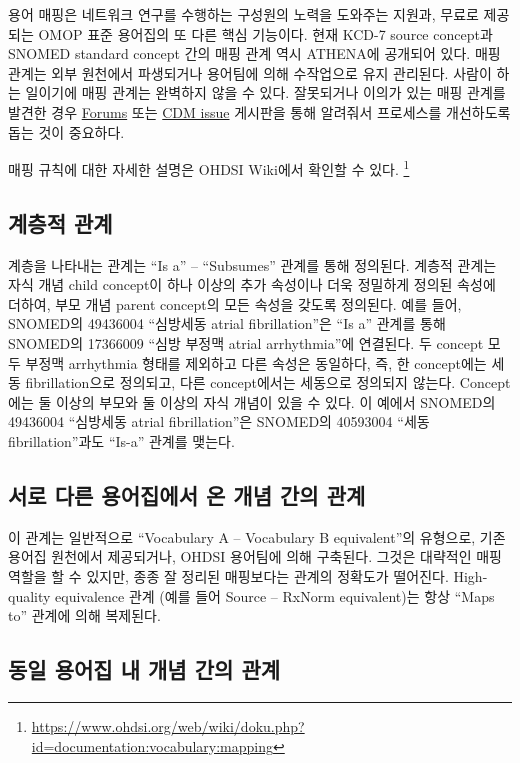 \documentclass[10.5pt]{book}
\let\rmarkdownfootnote\footnote%
\def\footnote{\protect\rmarkdownfootnote}
\theoremstyle{definition}
\theoremstyle{definition}
\theoremstyle{definition}
\theoremstyle{remark}
\begin{document}
용어 매핑은 네트워크 연구를 수행하는 구성원의 노력을 도와주는 지원과,
무료로 제공되는 OMOP 표준 용어집의 또 다른 핵심 기능이다. 현재 KCD-7
source concept과 SNOMED standard concept 간의 매핑 관계 역시 ATHENA에
공개되어 있다. 매핑 관계는 외부 원천에서 파생되거나 용어팀에 의해
수작업으로 유지 관리된다. 사람이 하는 일이기에 매핑 관계는 완벽하지 않을
수 있다. 잘못되거나 이의가 있는 매핑 관계를 발견한 경우
\href{https://forums.ohdsi.org}{Forums} 또는
\href{https://github.com/OHDSI/CommonDataModel/issues}{CDM issue}
게시판을 통해 알려줘서 프로세스를 개선하도록 돕는 것이 중요하다.

매핑 규칙에 대한 자세한 설명은 OHDSI Wiki에서 확인할 수 있다. \footnote{\url{https://www.ohdsi.org/web/wiki/doku.php?id=documentation:vocabulary:mapping}}

\subsection{계층적 관계}\label{-}

계층을 나타내는 관계는 ``Is a'' -- ``Subsumes'' 관계를 통해 정의된다.
계층적 관계는 자식 개념 child concept이 하나 이상의 추가 속성이나 더욱
정밀하게 정의된 속성에 더하여, 부모 개념 parent concept의 모든 속성을
갖도록 정의된다. 예를 들어, SNOMED의 49436004 ``심방세동 atrial
fibrillation''은 ``Is a'' 관계를 통해 SNOMED의 17366009 ``심방 부정맥
atrial arrhythmia''에 연결된다. 두 concept 모두 부정맥 arrhythmia 형태를
제외하고 다른 속성은 동일하다, 즉, 한 concept에는 세동 fibrillation으로
정의되고, 다른 concept에서는 세동으로 정의되지 않는다. Concept에는 둘
이상의 부모와 둘 이상의 자식 개념이 있을 수 있다. 이 예에서 SNOMED의
49436004 ``심방세동 atrial fibrillation''은 SNOMED의 40593004 ``세동
fibrillation''과도 ``Is-a'' 관계를 맺는다. 

\subsection{서로 다른 용어집에서 온 개념 간의 관계}\label{------}

이 관계는 일반적으로 ``Vocabulary A -- Vocabulary B equivalent''의
유형으로, 기존 용어집 원천에서 제공되거나, OHDSI 용어팀에 의해 구축된다.
그것은 대략적인 매핑 역할을 할 수 있지만, 종종 잘 정리된 매핑보다는
관계의 정확도가 떨어진다. High-quality equivalence 관계 (예를 들어
Source -- RxNorm equivalent)는 항상 ``Maps to'' 관계에 의해 복제된다.

\subsection{동일 용어집 내 개념 간의 관계}\label{-----}
\end{document}
